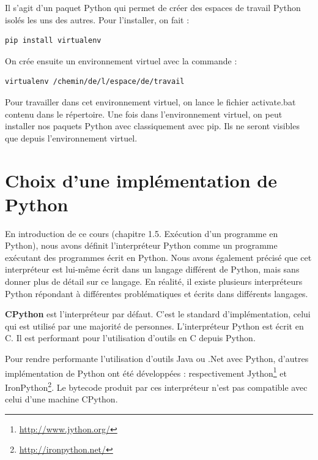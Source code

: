 \documentclass[12pt, a4paper]{article}
\begin{document}
Il s'agit d'un paquet Python qui permet de créer des espaces de travail Python isolés les uns des autres. Pour l'installer, on fait :
\begin{lstlisting}
pip install virtualenv
\end{lstlisting}

On crée ensuite un environnement virtuel avec la commande :
\begin{lstlisting}
virtualenv /chemin/de/l/espace/de/travail
\end{lstlisting}

Pour travailler dans cet environnement virtuel, on lance le fichier activate.bat contenu dans le répertoire. Une fois dans l'environnement virtuel, on peut installer nos paquets Python avec classiquement avec pip. Ils ne seront visibles que depuis l'environnement virtuel.







\section*{Choix d'une implémentation de Python}
En introduction de ce cours (chapitre 1.5. Exécution d'un programme en Python), nous avons définit l'interpréteur Python comme un programme exécutant des programmes écrit en Python. Nous avons également précisé que cet interpréteur est lui-même écrit dans un langage différent de Python, mais sans donner plus de détail sur ce langage. En réalité, il existe plusieurs interpréteurs Python répondant à différentes problématiques et écrits dans différents langages.

\textbf{CPython} est l'interpréteur par défaut. C'est le standard d'implémentation, celui qui est utilisé par une majorité de personnes. L'interpréteur Python est écrit en C. Il est performant pour l'utilisation d'outils en C depuis Python.

Pour rendre performante l'utilisation d'outils Java ou .Net avec Python, d'autres implémentation de Python ont été développées : respectivement Jython\footnote{\url{http://www.jython.org/}} et IronPython\footnote{\url{http://ironpython.net/}}. Le bytecode produit par ces interpréteur n'est pas compatible avec celui d'une machine CPython.
\end{document}
